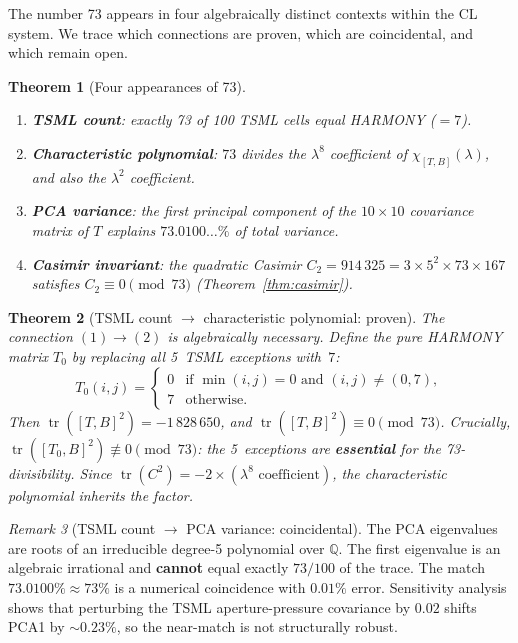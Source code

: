 \documentclass[11pt]{article}
\newtheorem{theorem}{Theorem}[section]
\theoremstyle{definition}
\theoremstyle{remark}
\newtheorem{remark}[theorem]{Remark}
\begin{document}
The number 73 appears in four algebraically distinct contexts within the CL
system.  We trace which connections are proven, which are coincidental, and
which remain open.

\begin{theorem}[Four appearances of 73]
\label{thm:73-appearances}
\begin{enumerate}[label=\textup{(\arabic*)}]
  \item \textbf{TSML count}: exactly 73 of 100 TSML cells equal HARMONY ($=7$).
  \item \textbf{Characteristic polynomial}: $73$ divides the $\lambda^8$
        coefficient of $\chi_{[T,B]}(\lambda)$, and also the $\lambda^2$
        coefficient.
  \item \textbf{PCA variance}: the first principal component of the
        $10 \times 10$ covariance matrix of $T$ explains $73.0100\ldots\%$ of
        total variance.
  \item \textbf{Casimir invariant}: the quadratic Casimir
        $C_2 = 914\,325 = 3 \times 5^2 \times 73 \times 167$ satisfies
        $C_2 \equiv 0 \pmod{73}$ (Theorem~\ref{thm:casimir}).
\end{enumerate}
\end{theorem}

\begin{theorem}[TSML count $\to$ characteristic polynomial: proven]
\label{thm:73-bridge-proven}
The connection $(1) \to (2)$ is algebraically necessary.  Define the pure
HARMONY matrix $T_0$ by replacing all 5~TSML exceptions with~$7$:
\[
  T_0(i,j) = \begin{cases} 0 & \text{if } \min(i,j) = 0 \text{ and } (i,j)
  \neq (0,7), \\
  7 & \text{otherwise}. \end{cases}
\]
Then $\operatorname{tr}([T,B]^2) = -1\,828\,650$, and
$\operatorname{tr}([T,B]^2) \equiv 0 \pmod{73}$.  Crucially,
$\operatorname{tr}([T_0,B]^2) \not\equiv 0 \pmod{73}$: the 5~exceptions are
\textbf{essential} for the 73-divisibility.  Since
$\operatorname{tr}(C^2) = -2 \times (\lambda^8\text{ coefficient})$, the
characteristic polynomial inherits the factor.
\end{theorem}

\begin{remark}[TSML count $\to$ PCA variance: coincidental]
\label{rem:73-pca}
The PCA eigenvalues are roots of an irreducible degree-5 polynomial over
$\mathbb{Q}$.  The first eigenvalue is an algebraic irrational and
\textbf{cannot} equal exactly $73/100$ of the trace.  The match
$73.0100\% \approx 73\%$ is a numerical coincidence with $0.01\%$ error.
Sensitivity analysis shows that perturbing the TSML aperture-pressure
covariance by $0.02$ shifts PCA1 by $\sim 0.23\%$, so the near-match is not
structurally robust.
\end{remark}
\end{document}
